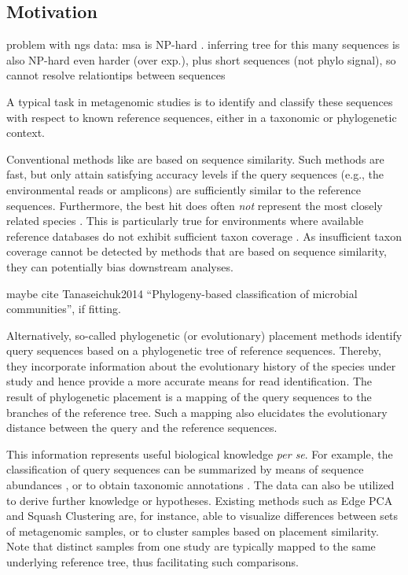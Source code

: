\subsection{Motivation}
\label{ch:Foundations:sec:PhylogeneticPlacement:sub:Motivation}


problem with ngs data:
msa is NP-hard \cite{Just2001}.
inferring tree for this many sequences is also NP-hard \cite{Chor2005} even harder (over exp.), plus
short sequences (not phylo signal), so cannot resolve relationtips between sequences


A typical task in metagenomic studies is to identify and classify these sequences with respect
to known reference sequences, either in a taxonomic or phylogenetic context.

Conventional methods like  \cite{Altschul1990} are based on sequence similarity.
Such methods are fast, but only attain satisfying accuracy levels
if the query sequences (e.g., the environmental reads or amplicons) are sufficiently similar to the reference sequences.
Furthermore, the best  hit does often \emph{not} represent the most closely related species \cite{Koski2001}.
This is particularly true for environments where available reference databases
do not exhibit sufficient taxon coverage \citep{Mahe2017}.
As insufficient taxon coverage cannot be detected by methods that are based on sequence similarity,
they can potentially bias downstream analyses.

maybe cite Tanaseichuk2014 ``Phylogeny-based classification of microbial communities'', if fitting.

Alternatively, so-called phylogenetic (or evolutionary) placement methods \cite{Matsen2010,Berger2011,Barbera2018}
identify query sequences based on a phylogenetic tree of reference sequences.
Thereby, they incorporate information about the evolutionary history of the species under study
and hence provide a more accurate means for read identification.
The result of phylogenetic placement is a mapping of the query sequences to the branches of the reference tree.
Such a mapping also elucidates the evolutionary distance between the query and the reference sequences.

This information represents useful biological knowledge \emph{per se}.
For example, the classification of query sequences can be summarized by means of sequence abundances \cite{Pace1997,Hugenholtz1998},
or to obtain taxonomic annotations \cite{Kozlov2016}.
The data can also be utilized to derive further knowledge or hypotheses.
Existing methods such as Edge PCA and Squash Clustering \cite{Matsen2011a} are, for instance, able
to visualize differences between sets of metagenomic samples,
or to cluster samples based on placement similarity.
Note that distinct samples from one study are typically mapped to the same underlying reference tree,
thus facilitating such comparisons.



